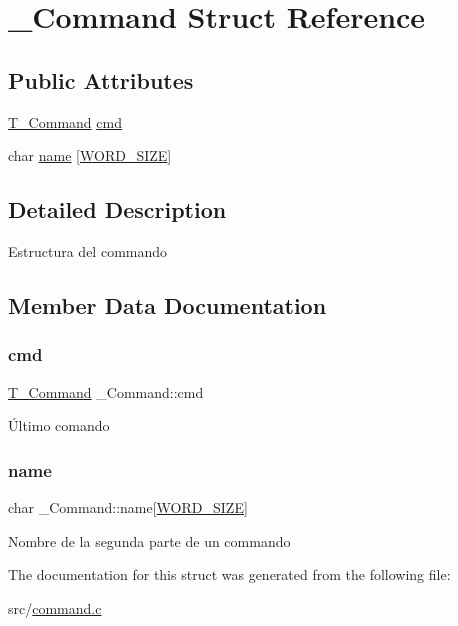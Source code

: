 \hypertarget{struct__Command}{}\section{\+\_\+\+Command Struct Reference}
\label{struct__Command}
\subsection*{Public Attributes}
\begin{DoxyCompactItemize}
\item 
\hyperlink{command_8h_a0473597db8c45c0289b6b8e2f8abbe32}{T\+\_\+\+Command} \hyperlink{struct__Command_a61f89a0ef775ee09992b647cb25029c4}{cmd}
\item 
char \hyperlink{struct__Command_a08f9c6b984243b637887e0bf0c50bd7e}{name} \mbox{[}\hyperlink{types_8h_a92ed8507d1cd2331ad09275c5c4c1c89}{W\+O\+R\+D\+\_\+\+S\+I\+ZE}\mbox{]}
\end{DoxyCompactItemize}


\subsection{Detailed Description}
Estructura del commando 

\subsection{Member Data Documentation}
\mbox{\label{struct__Command_a61f89a0ef775ee09992b647cb25029c4}} 
\subsubsection{\texorpdfstring{cmd}{cmd}}
{\footnotesize\ttfamily \hyperlink{command_8h_a0473597db8c45c0289b6b8e2f8abbe32}{T\+\_\+\+Command} \+\_\+\+Command\+::cmd}

Último comando \mbox{\label{struct__Command_a08f9c6b984243b637887e0bf0c50bd7e}} 
\subsubsection{\texorpdfstring{name}{name}}
{\footnotesize\ttfamily char \+\_\+\+Command\+::name\mbox{[}\hyperlink{types_8h_a92ed8507d1cd2331ad09275c5c4c1c89}{W\+O\+R\+D\+\_\+\+S\+I\+ZE}\mbox{]}}

Nombre de la segunda parte de un commando 

The documentation for this struct was generated from the following file\+:\begin{DoxyCompactItemize}
\item 
src/\hyperlink{command_8c}{command.\+c}\end{DoxyCompactItemize}
